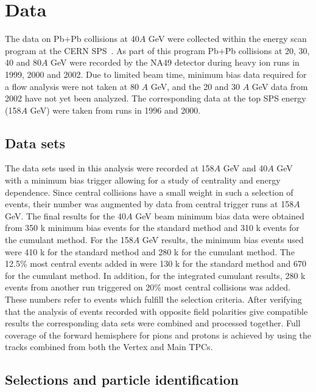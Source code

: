 \documentclass[aps,prc,superscriptaddress,showpacs,floatfix,nofootinbib]{revtex4}
\begin{document}
\section{Data}
\label{s:data}


The data on Pb+Pb collisions at 40$A$ GeV were collected within
the energy scan program at the CERN SPS~\cite{NA49-ADD1}. As part of
this program Pb+Pb collisions at 20, 30, 40 and 80$A$ GeV were
recorded by the NA49 detector during heavy ion runs in 1999, 2000 and
2002.  Due to limited beam time, minimum bias data required for a flow
analysis were not taken at 80 $A$ GeV, and the 20 and 30
$A$ GeV data from 2002 have not yet been analyzed. The
corresponding data at the top SPS energy (158$A$ GeV) were taken
from runs in 1996 and 2000.

\subsection{Data sets}
\label{s:datasets}

The data sets used in this analysis were recorded at 158$A$ GeV
and 40$A$ GeV with a minimum bias trigger allowing for a study of
centrality and energy dependence.  Since central collisions have a
small weight in such a selection of events, their number was augmented
by data from central trigger runs at 158$A$ GeV. The final
results for the 40$A$ GeV beam minimum bias data were obtained
from 350 k minimum bias events for the standard method and 310 k
events for the cumulant method. For the 158$A$ GeV results, the
minimum bias events used were 410 k for the standard method and 280 k
for the cumulant method. The 12.5\% most central events added in were
130 k for the standard method and 670 for the cumulant method. In
addition, for the integrated cumulant results, 280 k events from
another run triggered on 20\% most central collisions was added. 
These numbers refer to events which fulfill the selection criteria. 
After verifying that the
analysis of events recorded with opposite field polarities give
compatible results the corresponding data sets were combined and
processed together.  Full coverage of the forward hemisphere for pions
and protons is achieved by using the tracks combined from both the
Vertex and Main TPCs.


\subsection{Selections and particle identification}
\label{s:selections}
\end{document}
